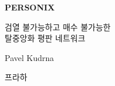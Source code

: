 \thispagestyle{empty}
\begin{center}
  {\sffamily\bfseries\fontsize{34}{40}\selectfont PERSONIX\par}
  \vspace{2.2em}
  {\rmfamily\large 검열 불가능하고 매수 불가능한\\[0.25em]
   탈중앙화 평판 네트워크\par}
\end{center}
\begin{center}
  {\rmfamily\Large Pavel Kudrna\par}
  \vspace{0.45em}
  {\rmfamily\small 프라하\quad\textbullet{}\par}
\end{center}
\clearpage
